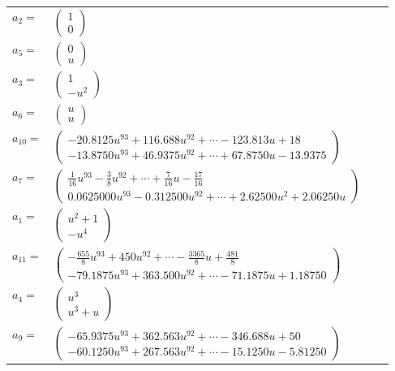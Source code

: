 \documentclass[1p]{elsarticle_modified}
\theoremstyle{definition}
\begin{document}
\begin{tabular}{m{7pt} m{180pt} m{7pt} m{180pt} }
\flushright $a_{2}=$&$\begin{pmatrix}1\\0\end{pmatrix}$ \\
\flushright $a_{5}=$&$\begin{pmatrix}0\\u\end{pmatrix}$ \\
\flushright $a_{3}=$&$\begin{pmatrix}1\\- u^2\end{pmatrix}$ \\
\flushright $a_{6}=$&$\begin{pmatrix}u\\u\end{pmatrix}$ \\
\flushright $a_{10}=$&$\begin{pmatrix}-20.8125 u^{93}+116.688 u^{92}+\cdots-123.813 u+18\\-13.8750 u^{93}+46.9375 u^{92}+\cdots+67.8750 u-13.9375\end{pmatrix}$ \\
\flushright $a_{7}=$&$\begin{pmatrix}\frac{1}{16} u^{93}-\frac{3}{8} u^{92}+\cdots+\frac{7}{16} u-\frac{17}{16}\\0.0625000 u^{93}-0.312500 u^{92}+\cdots+2.62500 u^{2}+2.06250 u\end{pmatrix}$ \\
\flushright $a_{1}=$&$\begin{pmatrix}u^2+1\\- u^4\end{pmatrix}$ \\
\flushright $a_{11}=$&$\begin{pmatrix}-\frac{655}{8} u^{93}+450 u^{92}+\cdots-\frac{3365}{8} u+\frac{481}{8}\\-79.1875 u^{93}+363.500 u^{92}+\cdots-71.1875 u+1.18750\end{pmatrix}$ \\
\flushright $a_{4}=$&$\begin{pmatrix}u^3\\u^3+u\end{pmatrix}$ \\
\flushright $a_{9}=$&$\begin{pmatrix}-65.9375 u^{93}+362.563 u^{92}+\cdots-346.688 u+50\\-60.1250 u^{93}+267.563 u^{92}+\cdots-15.1250 u-5.81250\end{pmatrix}$ \\

\end{tabular}
\end{document}

